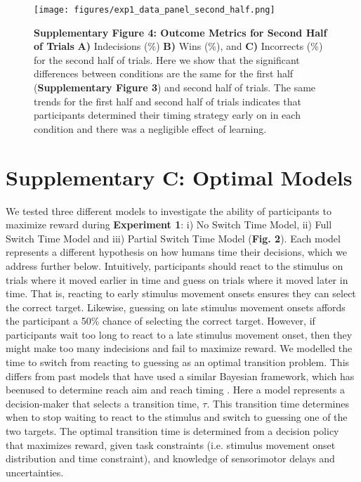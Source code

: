 \documentclass[12pt]{article}
\newcommand\boldblue[1]{\textcolor{mydarkblue}{\textbf{#1}}}
\begin{document}
\begin{figure}[H]
    \centering
    \texttt{[image: figures/exp1\_data\_panel\_second\_half.png]}

    \caption*{
        \boldblue{Supplementary Figure 4: Outcome Metrics for Second Half of Trials} \boldblue{A)} Indecisions (\%) \boldblue{B)} Wins (\%), and \boldblue{C)} Incorrects (\%) for the second half of trials. 
        Here we show that the significant differences between conditions are the same for the first half (\boldblue{Supplementary Figure 3}) and second half of trials.         
        The same trends for the first half and second half of trials indicates that participants determined their timing strategy early on in each condition and there was a negligible effect of learning. 
    } 
\end{figure}

\newpage
\section{Supplementary C: Optimal Models}
\vspace{-1mm}

\noindent We tested three different models to investigate the ability of participants to maximize reward during \boldblue{Experiment 1}: i) No Switch Time Model, ii) Full Switch Time Model and iii) Partial Switch Time Model (\boldblue{Fig. 2}). Each model represents a different hypothesis on how humans time their decisions, which we address further below. Intuitively, participants should react to the stimulus on trials where it moved earlier in time and guess on trials where it moved later in time. That is, reacting to early stimulus movement onsets ensures they can select the correct target. Likewise, guessing on late stimulus movement onsets affords the participant a 50\% chance of selecting the correct target. However, if participants wait too long to react to a late stimulus movement onset, then they might make too many indecisions and fail to maximize reward.
We modelled the time to switch from reacting to guessing as an optimal transition problem. This differs from past models that have used a similar Bayesian framework, which has beenused to determine reach aim \autocite{trommershauserStatisticalDecisionTheory2003} and reach timing \autocite{hudsonOptimalCompensationTemporal2008}. Here a model represents a decision-maker that selects a transition time, $\tau$. This transition time determines when to stop waiting to react to the stimulus and switch to guessing one of the two targets. The optimal transition time is determined from a decision policy that maximizes reward, given task constraints (i.e. stimulus movement onset distribution and time constraint), and knowledge of sensorimotor delays and uncertainties.
\end{document}
